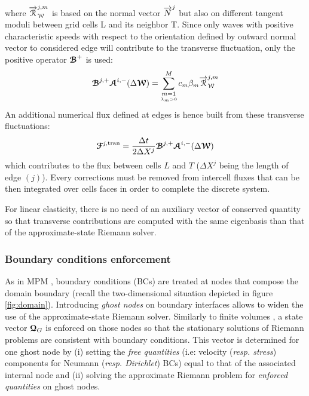 where ${\overrightarrow{\mathcal{R}}}_{\mathcal{W}}^{j,m}$ is based on the normal vector ${\overrightarrow{N}}^j$ but also on different tangent moduli between grid cells L and its neighbor T. Since only waves with positive characteristic speeds with respect to the orientation defined by outward normal vector to considered edge will contribute to the transverse fluctuation, only the positive operator ${\boldsymbol{\mathcal{B}}}^+$ is used:
\begin{equation}
{\boldsymbol{\mathcal{B}}}^{j,+} {\boldsymbol{\mathcal{A}}}^{i,-}(\Delta {\boldsymbol{\mathcal{W}}}) = \sum_{\underset{\lambda_m >0}{m=1}}^{M} c_m \beta_m {\overrightarrow{\mathcal{R}}}_{\mathcal{W}}^{j,m} \label{eq:transverse_fluctuations}
\end{equation}
An additional numerical flux defined at edges is hence built from these transverse fluctuations:
\begin{equation}
{\boldsymbol{\mathcal{F}}}^{j,\text{tran}} = \frac{\Delta t}{2 \Delta X^j} {\boldsymbol{\mathcal{B}}}^{j,+} {\boldsymbol{\mathcal{A}}}^{i,-}(\Delta {\boldsymbol{\mathcal{W}}}) \label{eq:transverse_corrections}
\end{equation}
which contributes to the flux between cells $L$ and $T$ ($\Delta X^j$ being the length of edge $(j)$). Every corrections must be removed from intercell fluxes that can be then integrated over cells faces in order to complete the discrete system.%

\begin{remark} 
  For linear elasticity, there is no need of an auxiliary vector of conserved quantity so that transverse contributions are computed with the same eigenbasis than that of the approximate-state Riemann solver.
\end{remark}

\subsubsection*{Boundary conditions enforcement}
As in MPM \cite{Love,BC_MPM}, boundary conditions (BCs) are treated at nodes that compose the domain boundary (recall the two-dimensional situation depicted in figure \ref{fig:domain}). Introducing \textit{ghost nodes} on boundary interfaces allows to widen the use of the approximate-state Riemann solver. Similarly to finite volumes \cite{Leveque}, a state vector ${\boldsymbol{\mathcal{Q}}}_G$ is enforced on those nodes so that the stationary solutions of Riemann problems are consistent with boundary conditions. This vector is determined for one ghost node by (i) setting the \textit{free quantities} (i.e: velocity (\textit{resp. stress}) components for Neumann (\textit{resp. Dirichlet}) BCs) equal to that of the associated internal node and (ii) solving the approximate Riemann problem for \textit{enforced quantities} on ghost nodes.

